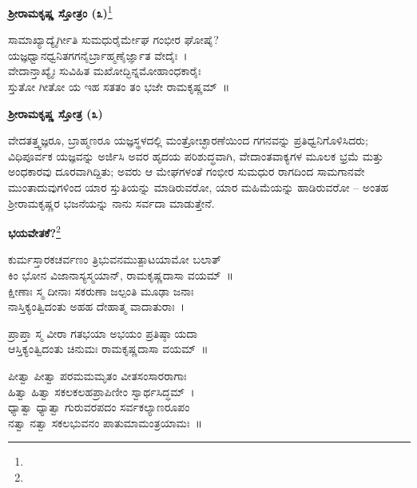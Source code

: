 \begin{center}
\textbf{ಶ‍್ರೀರಾಮಕೃಷ್ಣ ಸ್ತೋತ್ರಂ (೩)}\footnote{}
\end{center}

\begin{myquote}
ಸಾಮಾಖ್ಯಾದ್ಯೈರ್ಗೀತಿ ಸುಮಧುರೈರ್ಮೇಘ ಗಂಭೀರ ಘೋಷೈ?\\ಯಜ್ಞಧ್ವಾನಧ್ವನಿತಗಗನೈರ್ಬ್ರಾಹ್ಮಣೈರ್ಜ್ಞಾತ ವೇದೈಃ~।\\ವೇದಾನ್ತಾಖ್ಯೈಃ ಸುವಿಹಿತ ಮಖೋದ್ಭಿನ್ನಮೋಹಾಂಧಕಾರೈಃ\\ಸ್ತುತೋ ಗೀತೋ ಯ ಇಹ ಸತತಂ ತಂ ಭಜೇ ರಾಮಕೃಷ್ಣಮ್~॥
\end{myquote}

\begin{center}
\textbf{ಶ‍್ರೀರಾಮಕೃಷ್ಣ ಸ್ತೋತ್ರ (೩)}
\end{center}

ವೇದತತ್ತ್ವಜ್ಞರೂ, ಬ್ರಾಹ್ಮಣರೂ ಯಜ್ಞಸ್ಥಳದಲ್ಲಿ ಮಂತ್ರೋಚ್ಛಾರಣೆಯಿಂದ ಗಗನವನ್ನು ಪ್ರತಿಧ್ವನಿಗೊಳಿಸಿದರು; ವಿಧಿಪೂರ್ವಕ ಯಜ್ಞವನ್ನು ಅರ್ಜಿಸಿ ಅವರ ಹೃದಯ ಪರಿಶುದ್ಧವಾಗಿ, ವೇದಾಂತವಾಕ್ಯಗಳ ಮೂಲಕ ಭ್ರಮೆ ಮತ್ತು ಅಂಧಕಾರವು ದೂರವಾಗಿದ್ದಿತು; ಅವರು ಆ ಮೇಘಗಳಂತೆ ಗಂಭೀರ ಸುಮಧುರ ರಾಗದಿಂದ ಸಾಮಗಾನವೇ ಮುಂತಾದುವುಗಳಿಂದ ಯಾರ ಸ್ತುತಿಯನ್ನು ಮಾಡಿರುವರೋ, ಯಾರ ಮಹಿಮೆಯನ್ನು ಹಾಡಿರುವರೋ – ಅಂತಹ ಶ‍್ರೀರಾಮಕೃಷ್ಣರ ಭಜನೆಯನ್ನು ನಾನು ಸರ್ವದಾ ಮಾಡುತ್ತೇನೆ.

\begin{center}
\textbf{ಭಯವೇತಕೆ?}\footnote{}
\end{center}

\begin{myquote}
ಕುರ್ಮಸ್ತಾರಕಚರ್ವಣಂ ತ್ರಿಭುವನಮುತ್ಪಾಟಯಾಮೋ ಬಲಾತ್\\ಕಿಂ ಭೋನ ವಿಜಾನಾಸ್ಯಸ್ಮಯಾನ್, ರಾಮಕೃಷ್ಣದಾಸಾ ವಯಮ್~॥\\ಕ್ಷೀಣಾಃ ಸ್ಮ ದೀನಾಃ ಸಕರುಣಾ ಜಲ್ಪಂತಿ ಮೂಢಾ ಜನಾಃ\\ನಾಸ್ತಿಕ್ಯಂತ್ವಿದಂತು ಅಹಹ ದೇಹಾತ್ಮ ವಾದಾತುರಾಃ~।
\end{myquote}

\begin{myquote}
ಪ್ರಾಪ್ತಾ ಸ್ಮ ವೀರಾ ಗತಭಯಾ ಅಭಯಂ ಪ್ರತಿಷ್ಠಾ ಯದಾ\\ಆಸ್ತಿಕ್ಯಂತ್ವಿದಂತು ಚಿನುಮಃ ರಾಮಕೃಷ್ಣದಾಸಾ ವಯಮ್~॥
\end{myquote}

\begin{myquote}
ಪೀತ್ವಾ ಪೀತ್ವಾ ಪರಮಮಮೃತಂ ವೀತಸಂಸಾರರಾಗಾಃ\\ಹಿತ್ವಾ ಹಿತ್ವಾ ಸಕಲಕಲಹಪ್ರಾಪಿಣೀಂ ಸ್ವಾರ್ಥಸಿದ್ಧಮ್~।\\ಧ್ಯಾತ್ವಾ ಧ್ಯಾತ್ವಾ ಗುರುವರಪದಂ ಸರ್ವಕಲ್ಯಾಣರೂಪಂ\\ನತ್ವಾ ನತ್ವಾ ಸಕಲಭುವನಂ ಪಾತುಮಾಮಂತ್ರಯಾಮಃ~॥
\end{myquote}


